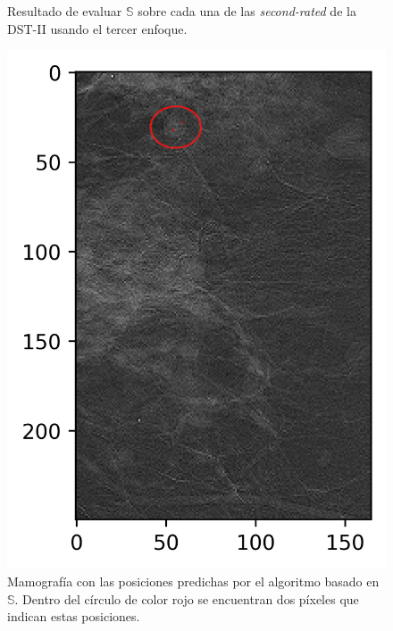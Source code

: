 \begin{figure}
	\caption{Resultado de evaluar $\mathbb{S}$ sobre cada una de las \textit{second-rated} de la DST-II usando el tercer enfoque.} \label{fig:example-mm-approach3}
\end{figure}


\begin{figure}
	\centering
	\includegraphics{Graphics/mm-detection-s-on-mm.png}
	\caption{Mamografía con las posiciones predichas por el algoritmo basado en $\mathbb{S}$. Dentro del círculo de color rojo se encuentran dos píxeles que indican estas posiciones.} \label{fig:mm-approach2-mm-s}
\end{figure}

